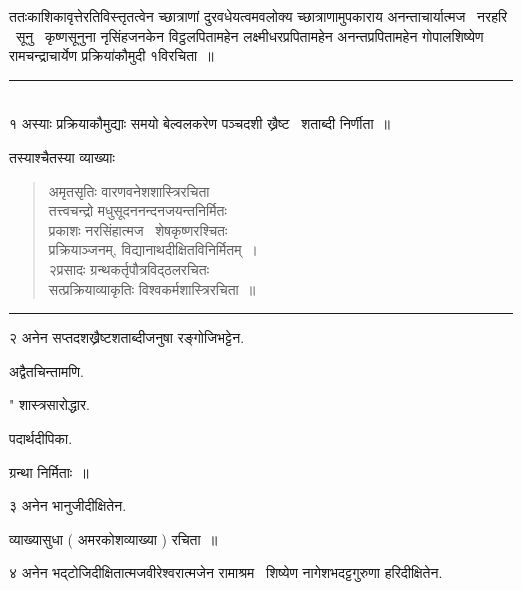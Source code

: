 \documentclass[11pt, openany]{book}
\makeatletter
\newcommand{\devanagarinumeral}[1]{
\devanagaridigits{\number \csname c@#1\endcsname}} %
\makeatother
\begin{document}
\fancyhead[RO,LE]{\thepage}
\cfoot{}
\newpage
\renewcommand{\thepage}{\devanagarinumeral{page}}
\setcounter{page}{21}


\begin{multicols}{2}
ततःकाशिकावृत्तेरतिविस्त्तृतत्वेन च्छात्राणां दुरवधेयत्वमवलोक्य च्छात्राणामुपकाराय अनन्ताचार्यात्मज \textendash\ नरहरि \textendash\ सूनु \textendash\ कृष्णसूनुना नृसिंहजनकेन विट्ठलपितामहेन लक्ष्मीधरप्रपितामहेन अनन्तप्रपितामहेन गोपालशिष्येण रामचन्द्राचार्येण प्रक्रिया॑कौमुदी १विरचिता~॥

\noindent
\rule{1\linewidth}{0.5pt}\\

१ अस्याः प्रक्रियाकौमुद्याः समयो बेल्वलकरेण पञ्चदशी ख्रैष्ट \textendash\ शताब्दी निर्णीता~॥

तस्याश्चैतस्या व्याख्याः \textendash\ 

\begin{quote}
{\qt अमृतसृतिः वारणवनेशशास्त्रिरचिता\\
तत्त्वचन्द्रो मधुसूदननन्दनजयन्तनिर्मितः\\
प्रकाशः नरसिंहात्मज \textendash\ शेषकृष्णरश्चितः\\
प्रक्रियाञ्जनम्, विद्यानाथदीक्षितविनिर्मितम्~। \\
२प्रसादः ग्रन्थकर्तृपौत्रविद्ठलरचितः\\
सत्प्रक्रियाव्याकृतिः विश्वकर्मशास्त्रिरचिता~॥}
\end{quote}

\begin{center}
\rule{0.2\linewidth}{0.5pt}
\end{center}

२ अनेन सप्तदशख्रैष्टशताब्दीजनुषा रङ्गोजिभट्टेन. \textendash\

अद्वैतचिन्तामणि. 

" शास्त्रसारोद्धार. 

पदार्थदीपिका. 

ग्रन्था निर्मिताः~॥ 

३ अनेन भानुजीदीक्षितेन. \textendash\ 

व्याख्यासुधा ( अमरकोशव्याख्या ) रचिता~॥ 

४ अनेन भद्टोजिदीक्षितात्मजवीरेश्वरात्मजेन रामाश्रम \textendash\ शिष्येण नागेशभदट्टगुरुणा हरिदीक्षितेन. \textendash\


\end{multicols}
\end{document}
